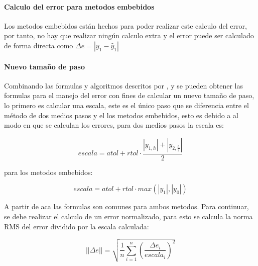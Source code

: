             \paragraph{Calculo del error para metodos embebidos} 

                Los metodos embebidos están hechos para poder realizar este calculo del error, por tanto, no hay que realizar ningún calculo extra y el error puede ser calculado de forma directa como $\Delta e = \left| y_1 - \hat{y}_1\right|$

            \paragraph{Nuevo tamaño de paso}

                Combinando las formulas y algoritmos descritos por \textcite{roganprogramacion}, \textcite{hairer1991solving} y \textcite{ritschel2013numerical} se pueden obtener las formulas para el manejo del error con fines de calcular un nuevo tamaño de paso, lo primero es calcular una escala, este es el único paso que se diferencia entre el método de dos medios pasos y el los metodos embebidos, esto es debido a al modo en que se calculan los errores, para dos medios pasos la escala es:

                \begin{equation}\label{eq:escalaDos}
                    escala = atol + rtol \cdot \frac{\left|y_{1,h}\right| + \left|y_{2,\frac{h}{2}}\right|}{2}
                \end{equation}

                \noindent para los metodos embebidos:

                \begin{equation}\label{eq:escalaEmbebidos}
                    escala = atol + rtol \cdot max(\left| y_1\right|,\left| y_0\right|)
                \end{equation}
        
                A partir de aca las formulas son comunes para ambos metodos. Para continuar, se debe realizar el calculo de un error normalizado, para esto se calcula la norma RMS del error dividido por la escala calculada:

                \begin{equation}\label{eq:ErrorNormalizado}
                    ||\Delta e|| = \sqrt{\frac{1}{n} \sum_{i=1}^{n} \left(\frac{\Delta e_i}{escala_i}\right)^2}
                \end{equation}


